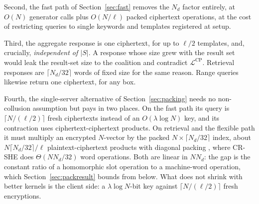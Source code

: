 \documentclass[a4paper,fleqn]{cas-sc}
\newcommand{\Leak}{\mathcal{L}}
\begin{document}
Second, the fast path of Section~\ref{sec:fast} removes the $N_d$ factor
entirely, at $O(N)$ generator calls plus $O(N/\ell)$ packed ciphertext
operations, at the cost of restricting queries to single keywords and
templates registered at setup.

Third, the aggregate response is one ciphertext, for up to $\ell/2$ templates,
and, crucially, \emph{independent of $|S|$}. A response whose size grew with the result set
would leak the result-set size to the coalition and contradict
$\Leak^{\text{CP}}$. Retrieval responses are $\lceil N_d/32\rceil$ words of
fixed size for the same reason. Range queries likewise return one ciphertext,
for any box.

Fourth, the single-server alternative of Section~\ref{sec:packing} needs no
non-collusion assumption but pays in two places. On the fast path its query is
$\lceil N/(\ell/2)\rceil$ fresh ciphertexts instead of an $O(\lambda\log N)$
key, and its contraction uses ciphertext-ciphertext products. On retrieval and
the flexible path it must multiply an encrypted $N$-vector by the packed
$N\times\lceil N_d/32\rceil$ index, about $N\lceil N_d/32\rceil/\ell$
plaintext-ciphertext products with diagonal packing
\citep{halevi2014algorithms}, where CR-SHE does $\Theta(NN_d/32)$ word
operations. Both are linear in $NN_d$: the gap is the constant ratio of a
homomorphic slot operation to a machine-word operation, which
Section~\ref{sec:packresult} bounds from below. What does not shrink with
better kernels is the client side: a $\lambda\log N$-bit key against
$\lceil N/(\ell/2)\rceil$ fresh encryptions.
\end{document}
